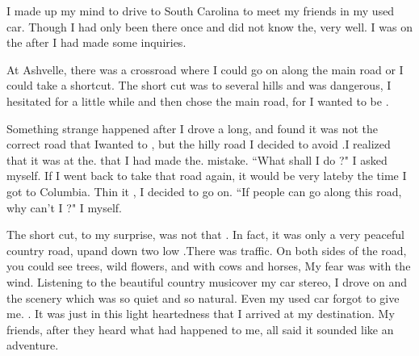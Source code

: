 \documentclass[color=orange]{textbook-cn}%
\begin{document}
\begin{Appendix}
\begin{Cloze}[文章标题]{5}{4.5}
\setcounter{wxcounter}{1}
	I made up my mind to drive to South Carolina to meet my friends in my used car. Though I had only been there once \wx and did not know the, \wx very well. I was on the \wx after I had made some inquiries.\par
	At Ashvelle, there was a crossroad where I could go on along the main road or I could take a shortcut. The short cut was to \wx several hills and was dangerous, I hesitated for a little while and then chose the main road, for I wanted to be \wx.\par
	Something strange happened after I drove a long, \wx and found it was not the correct road that Iwanted to \wx, but the hilly road I decided to avoid .I realized that it was at the. \wx that I had made the. \wx mistake. ``What shall I do ?" I asked myself. If I went back to take that road again, it would be very lateby the time I got to Columbia. Thin it \wx, I decided to go on. ``If \wx people can go along this road, why can't I ?" I \wx myself.\par
	The short cut, to my surprise, was not that \wx. In fact, it was only a very peaceful country road, \wx upand down two low \wx.There was \wx traffic. On both sides of the road, you could see trees, wild flowers, and \wx{} with cows and horses, My fear was \wx with the wind. Listening to the beautiful country musicover my car stereo, I drove on and \wx the scenery which was so quiet and so natural. Even my used car forgot to give me. \wx. It was just in this light heartedness that I arrived at my destination. My friends, after they heard what had happened to me, all said it sounded like an adventure.
\begin{QsNum}
\item {}
\item {}
\item {}
\item {}
\item {}
\item {}
\item {}
\item {}
\item {}
\item {}

\end{QsNum}
\end{Cloze}
\end{Appendix}
\end{document}
